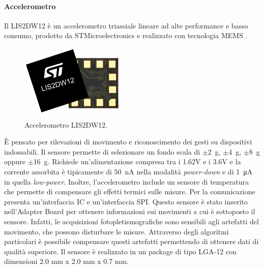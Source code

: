 \paragraph{Accelerometro} Il LIS2DW12 è un accelerometro triassiale lineare ad alte performance e basso consumo, prodotto da STMicroelectronics\cite{STElectronicsLIS2DW12} e realizzato con tecnologia MEMS . 
\begin{figure}[b]
	\centering
	\includegraphics[width=0.3\linewidth]{ImageFiles/Hardware/ImmagineLIS2DW12}
	\caption{Accelerometro LIS2DW12.}
	\label{fig:ImmagineLIS2DW12}
\end{figure}
\`E pensato per rilevazioni di movimento e riconoscimento dei gesti su dispositivi indossabili. Il sensore permette di selezionare un fondo scala di $\pm$\SI{2}{\gram}, $\pm$\SI{4}{\gram}, $\pm$\SI{8}{\gram} oppure $\pm$\SI{16}{\gram}. Richiede un'alimentazione compresa tra i 1.62V e i 3.6V e la corrente assorbita è tipicamente di \SI{50}{\nano\ampere} nella modalità \textit{power-down} e di \SI{1}{\micro\ampere} in quella \textit{low-power}. Inoltre, l'accelerometro include un sensore di temperatura che permette di compensare gli effetti termici sulle misure. Per la comunicazione presenta un'interfaccia IC e un'interfaccia SPI. Questo sensore è stato inserito nell'Adapter Board per ottenere informazioni sui movimenti a cui è sottoposto il sensore. Infatti, le acquisizioni fotopletismografiche sono sensibili agli artefatti del movimento, che possono disturbare le misure. Attraverso degli algoritmi particolari è possibile compensare questi artefatti permettendo di ottenere dati di qualità superiore. Il sensore è realizzato in un package di tipo LGA-12 con dimensioni 2.0 mm x 2.0 mm x 0.7 mm.

